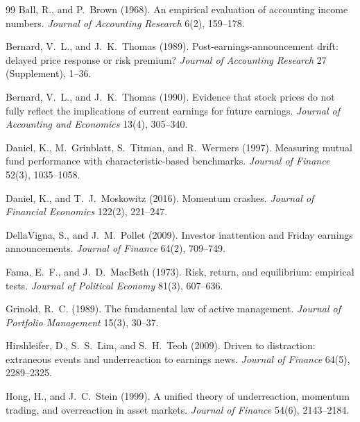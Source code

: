 \documentclass[11pt]{article}
\theoremstyle{definition}
\newcommand{\1}{\mathbf{1}}
\begin{document}
\begin{thebibliography}{99}\small
Ball, R., and P.~Brown (1968). An empirical evaluation of accounting income numbers.
\textit{Journal of Accounting Research} 6(2), 159--178.

Bernard, V.~L., and J.~K.~Thomas (1989). Post-earnings-announcement drift: delayed price
response or risk premium? \textit{Journal of Accounting Research} 27 (Supplement), 1--36.

Bernard, V.~L., and J.~K.~Thomas (1990). Evidence that stock prices do not fully reflect
the implications of current earnings for future earnings. \textit{Journal of Accounting and
Economics} 13(4), 305--340.

Daniel, K., M.~Grinblatt, S.~Titman, and R.~Wermers (1997). Measuring mutual fund
performance with characteristic-based benchmarks. \textit{Journal of Finance} 52(3),
1035--1058.

Daniel, K., and T.~J.~Moskowitz (2016). Momentum crashes. \textit{Journal of Financial
Economics} 122(2), 221--247.

DellaVigna, S., and J.~M.~Pollet (2009). Investor inattention and Friday earnings
announcements. \textit{Journal of Finance} 64(2), 709--749.

Fama, E.~F., and J.~D.~MacBeth (1973). Risk, return, and equilibrium: empirical tests.
\textit{Journal of Political Economy} 81(3), 607--636.

Grinold, R.~C. (1989). The fundamental law of active management. \textit{Journal of
Portfolio Management} 15(3), 30--37.

Hirshleifer, D., S.~S.~Lim, and S.~H.~Teoh (2009). Driven to distraction: extraneous events
and underreaction to earnings news. \textit{Journal of Finance} 64(5), 2289--2325.

Hong, H., and J.~C.~Stein (1999). A unified theory of underreaction, momentum trading, and
overreaction in asset markets. \textit{Journal of Finance} 54(6), 2143--2184.


\end{thebibliography}
\end{document}
